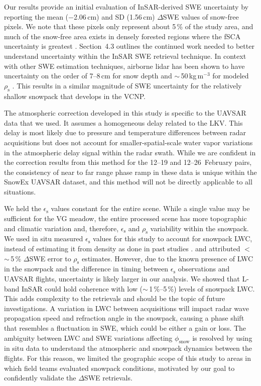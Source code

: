 Our results provide an initial evaluation of InSAR-derived SWE uncertainty by reporting the mean ($-$2.06\,cm) and SD (1.56\,cm) $\Delta$SWE values of snow-free pixels. We note that these pixels only represent about 5\,\% of the study area, and much of the snow-free area exists in densely forested regions where the fSCA uncertainty is greatest \citep{selkowitzUSGSLandsatSnow2017}. Section~4.3 outlines the continued work needed to better understand uncertainty within the InSAR SWE retrieval technique. In context with other SWE estimation techniques, airborne lidar has been shown to have uncertainty on the order of 7--8\,cm for snow depth \citep{currierComparingAerialLidar2019} and $\sim$\,50\,kg\,m$^{-3}$ for modeled $\rho_\mathrm{s}$ \citep{raleighSnowpackDensityModeling2017}. This results in a similar magnitude of SWE uncertainty for the relatively shallow snowpack that develops in the VCNP.

The atmospheric correction developed in this study is specific to the UAVSAR data that we used. It assumes a homogeneous delay related to the LKV. This delay is most likely due to pressure and temperature differences between radar acquisitions but does not account for smaller-spatial-scale water vapor variations in the atmospheric delay signal within the radar swath. While we are confident in the correction results from this method for the 12--19 and 12--26~February pairs, the consistency of near to far range phase ramp in these data is unique within the SnowEx UAVSAR dataset, and this method will not be directly applicable to all situations.


We held the $\epsilon_\mathrm{s}$ values constant for the entire scene. While a single value may be sufficient for the VG meadow, the entire processed scene has more topographic and climatic variation and, therefore, $\epsilon_\mathrm{s}$ and $\rho_\mathrm{s}$ variability within the snowpack. We used in situ measured $\epsilon_\mathrm{s}$ values for this study to account for snowpack LWC, instead of estimating it from density as done in past studies \citep{rottSnowMassRetrieval2003, deebMonitoringSnowpackEvolution2011, guneriussenInSAREstimationChanges2001}. \citet{epplerSnowWaterEquivalent2022} and \citet{leinssSnowWaterEquivalent2015} attributed $<$\,$\sim$\,5\,\% $\Delta$SWE error to $\rho_\mathrm{s}$ estimates. However, due to the known presence of LWC in the snowpack and the difference in timing between $\epsilon_\mathrm{s}$ observations and UAVSAR flights, uncertainty is likely larger in our analysis. We showed that L-band InSAR could hold coherence with low ($\sim$\,1\,\%--5\,\%) levels of snowpack LWC. This adds complexity to the retrievals and should be the topic of future investigations. A variation in LWC between acquisitions will impact radar wave propagation speed and refraction angle in the snowpack, causing a phase shift that resembles a fluctuation in SWE, which could be either a gain or loss. The ambiguity between LWC and SWE variations affecting $\phi_\mathrm{snow}$ is resolved by using in situ data to understand the atmospheric and snowpack dynamics between the flights. For this reason, we limited the geographic scope of this study to areas in which field teams evaluated snowpack conditions, motivated by our goal to confidently validate the $\Delta$SWE retrievals.


